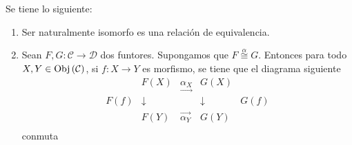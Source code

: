 \documentclass[12pt]{report}
\theoremstyle{largebreak}
\newcommand\cf[3]{\ensuremath{#1:#2\rightarrow#3}}
\newcommand{\Obj}[1]{\ensuremath{\textup{Obj}\left(#1\right)}}
\begin{document}
    \begin{obs}
        Se tiene lo siguiente:
        \begin{enumerate}
            \item Ser naturalmente isomorfo es una relación de equivalencia.
            \item Sean $\cf{F,G}{\mathcal{C}}{\mathcal{D}}$ dos funtores. Supongamos que $F\overset{\alpha}{\cong}G$. Entonces para todo $X,Y\in\Obj{\mathcal{C}}$, si $\cf{f}{X}{Y}$ es morfismo, se tiene que el diagrama siguiente
            \begin{equation*}
                \begin{array}{rcccl}
                    & F(X) & \underset{\longrightarrow}{\alpha_{X}} & G(X) &\\
                    F(f) & \downarrow & & \downarrow & G(f) \\
                    & F(Y) & \overset{\longrightarrow}{\alpha_{Y}} & G(Y) &\\
                \end{array}
            \end{equation*}
            conmuta
        \end{enumerate}
    \end{obs}

    \renewcommand{\theenumi}{\arabic{enumi}}
\end{document}
